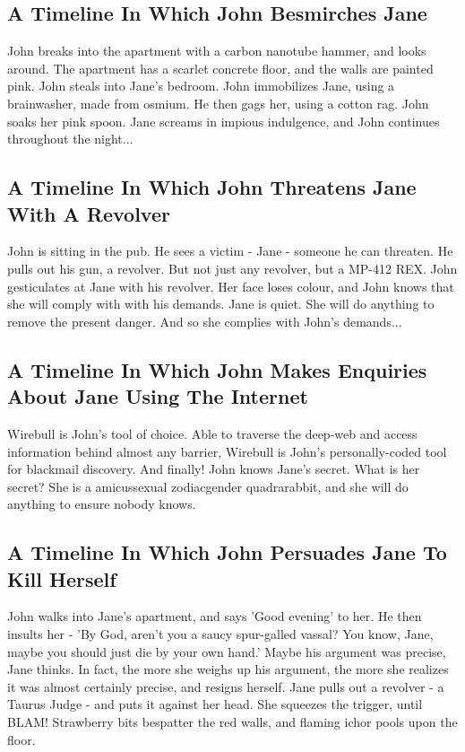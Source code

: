 \documentclass{article}
\begin{document}
\subsection{A Timeline In Which John Besmirches Jane}


John breaks into the apartment with a carbon nanotube hammer, and looks around.
The apartment has a scarlet concrete floor, and the walls are painted pink.
John steals into Jane's bedroom.
John immobilizes Jane, using a brainwasher, made from osmium.
He then gags her, using a cotton rag.
John soaks her pink spoon.
Jane screams in impious indulgence, and John continues throughout the night...
\subsection{A Timeline In Which John Threatens Jane With A Revolver}


John is sitting in the pub.
He sees a victim {-} Jane {-} someone he can threaten. He pulls out his gun, a revolver.
But not just any revolver, but a MP{-}412 REX.
John gesticulates at Jane with his revolver. Her face loses colour, and John knows that she will comply with with his demands.
Jane is quiet. She will do anything to remove the present danger. And so she complies with John's demands...
\subsection{A Timeline In Which John Makes Enquiries About Jane Using The Internet}


Wirebull is John's tool of choice. Able to traverse the deep{-}web and access information behind almost any barrier, Wirebull is John's personally{-}coded tool for blackmail discovery.
And finally!
John knows Jane's secret. What is her secret? She is a amicussexual zodiacgender quadrarabbit, and she will do anything to ensure nobody knows.
\subsection{A Timeline In Which John Persuades Jane To Kill Herself}


John walks into Jane's apartment, and says 'Good evening' to her.
He then insults her {-} 'By God, aren't you a saucy spur{-}galled vassal?
You know, Jane, maybe you should just die by your own hand.'
Maybe his argument was precise, Jane thinks.
In fact, the more she weighs up his argument, the more she realizes it was almost certainly precise, and resigns herself.
Jane pulls out a revolver {-} a Taurus Judge {-} and puts it against her head.
She squeezes the trigger, until BLAM!
Strawberry bits bespatter the red walls, and flaming ichor pools upon the floor.
\end{document}

